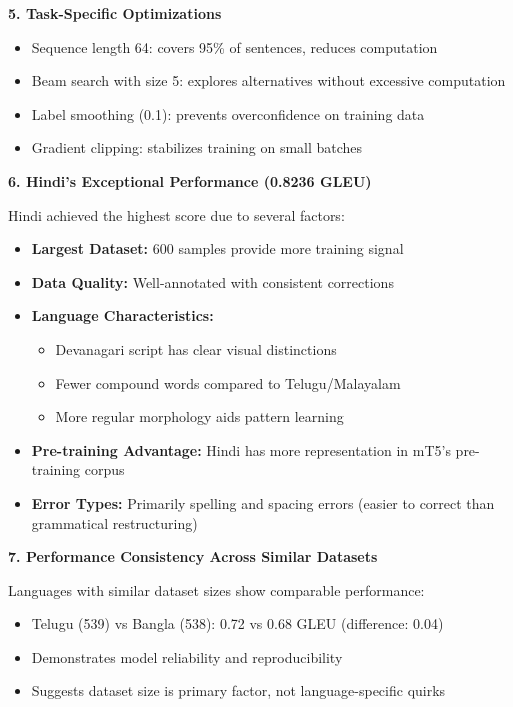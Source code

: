 \documentclass[12pt,a4paper]{article}
\begin{document}
\textbf{5. Task-Specific Optimizations}
\begin{itemize}
    \item Sequence length 64: covers 95\% of sentences, reduces computation
    \item Beam search with size 5: explores alternatives without excessive computation
    \item Label smoothing (0.1): prevents overconfidence on training data
    \item Gradient clipping: stabilizes training on small batches
\end{itemize}

\textbf{6. Hindi's Exceptional Performance (0.8236 GLEU)}

Hindi achieved the highest score due to several factors:
\begin{itemize}
    \item \textbf{Largest Dataset:} 600 samples provide more training signal
    \item \textbf{Data Quality:} Well-annotated with consistent corrections
    \item \textbf{Language Characteristics:}
    \begin{itemize}
        \item Devanagari script has clear visual distinctions
        \item Fewer compound words compared to Telugu/Malayalam
        \item More regular morphology aids pattern learning
    \end{itemize}
    \item \textbf{Pre-training Advantage:} Hindi has more representation in mT5's pre-training corpus
    \item \textbf{Error Types:} Primarily spelling and spacing errors (easier to correct than grammatical restructuring)
\end{itemize}

\textbf{7. Performance Consistency Across Similar Datasets}

Languages with similar dataset sizes show comparable performance:
\begin{itemize}
    \item Telugu (539) vs Bangla (538): 0.72 vs 0.68 GLEU (difference: 0.04)
    \item Demonstrates model reliability and reproducibility
    \item Suggests dataset size is primary factor, not language-specific quirks
\end{itemize}
\end{document}
